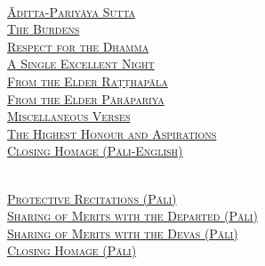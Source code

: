 {  \ifafive\vspace{1.0cm}\fi
  \ifninebythirteen\vspace{0.8cm}\fi
  \ifbfive\vspace{1.0cm}\fi

  {\libertinusFont\selectfont\textbf{\textsc{\ifafive\fontsize{18}{12}\fi\ifninebythirteen\fontsize{13}{8.5}\fi\ifbfive\fontsize{22}{18}\fi\selectfont{}}}}\\
  \textsc{\ifafive\fontsize{14.4}{28}\fi\ifninebythirteen\fontsize{8.7}{17}\fi\ifbfive\fontsize{16}{33.5}\fi\selectfont
    \hyperref[aditta-pariyaya]{Āditta-Pariyāya Sutta} \ifdigital\else\pageref{aditta-pariyaya}\fi\\
    \hyperref[burdens]{The Burdens} \ifdigital\else\pageref{burdens}\fi\\
    \hyperref[respect-for-the-dhamma]{Respect for the Dhamma} \ifdigital\else\pageref{respect-for-the-dhamma}\fi\\
    \hyperref[single-excellent-night]{A Single Excellent Night} \ifdigital\else\pageref{single-excellent-night}\fi\\
    \hyperref[ratthapala]{From the Elder Raṭṭhapāla}  \ifdigital\else\pageref{ratthapala}\fi\\
    \hyperref[parapariya]{From the Elder Pārāpariya} \ifdigital\else\pageref{parapariya}\fi\\
    \hyperref[misc-verses]{Miscellaneous Verses} \ifdigital\else\pageref{misc-verses}\fi\\
    \hyperref[highest-honour-aspirations]{The Highest Honour and Aspirations} \ifdigital\else\pageref{highest-honour-aspirations}\fi\\
    \hyperref[closing-homage]{Closing Homage (Pāli-English)} \ifdigital\else\pageref{closing-homage}\fi\\
  }

  \clearpage

  {\libertinusFont\selectfont\textbf{\textsc{\ifafive\fontsize{18}{12}\fi\ifninebythirteen\fontsize{13}{8.5}\fi\ifbfive\fontsize{22}{18}\fi\selectfont{}}}}\\
  \textsc{\ifafive\fontsize{14.4}{28}\fi\ifninebythirteen\fontsize{8.7}{17}\fi\ifbfive\fontsize{16}{33.5}\fi\selectfont
    \hyperref[invitation-to-the-devas]{Protective Recitations (Pāli)} \ifdigital\else\pageref{invitation-to-the-devas}\fi\\
    \hyperref[sharing-merits-departed]{Sharing of Merits with the Departed (Pāli)} \ifdigital\else\pageref{sharing-merits-departed}\fi\\
    \hyperref[sharing-merits-devas]{Sharing of Merits with the Devas (Pāli)} \ifdigital\else\pageref{sharing-merits-devas}\fi\\
    \hyperref[closing-homage]{Closing Homage (Pāli)} \ifdigital\else\pageref{closing-homage}\fi\\
  }

}
